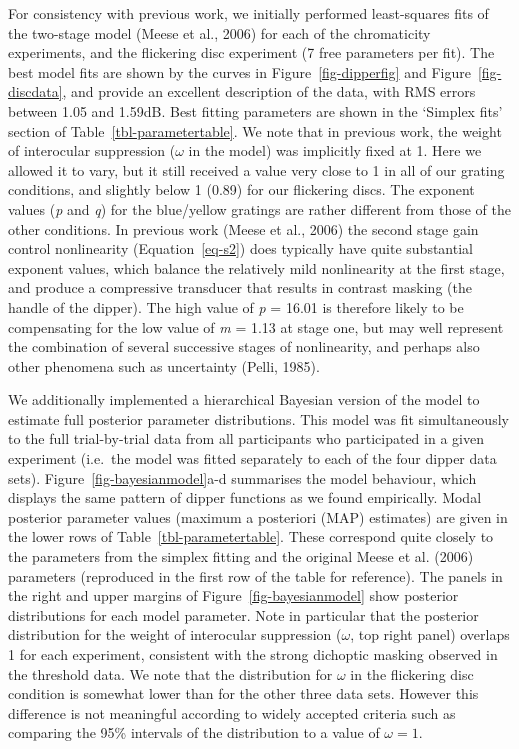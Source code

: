 \documentclass[
  letterpaper,
  DIV=11,
  numbers=noendperiod]{scrartcl}
\begin{document}
For consistency with previous work, we initially performed least-squares
fits of the two-stage model (Meese et al., 2006) for each of the
chromaticity experiments, and the flickering disc experiment (7 free
parameters per fit). The best model fits are shown by the curves in
Figure~\ref{fig-dipperfig} and Figure~\ref{fig-discdata}, and provide an
excellent description of the data, with RMS errors between 1.05 and
1.59dB. Best fitting parameters are shown in the `Simplex fits' section
of Table~\ref{tbl-parametertable}. We note that in previous work, the
weight of interocular suppression (\(\omega\) in the model) was
implicitly fixed at 1. Here we allowed it to vary, but it still received
a value very close to 1 in all of our grating conditions, and slightly
below 1 (0.89) for our flickering discs. The exponent values (\emph{p}
and \emph{q}) for the blue/yellow gratings are rather different from
those of the other conditions. In previous work (Meese et al., 2006) the
second stage gain control nonlinearity (Equation~\ref{eq-s2}) does
typically have quite substantial exponent values, which balance the
relatively mild nonlinearity at the first stage, and produce a
compressive transducer that results in contrast masking (the handle of
the dipper). The high value of \emph{p} = 16.01 is therefore likely to
be compensating for the low value of \emph{m} = 1.13 at stage one, but
may well represent the combination of several successive stages of
nonlinearity, and perhaps also other phenomena such as uncertainty
(Pelli, 1985).

We additionally implemented a hierarchical Bayesian version of the model
to estimate full posterior parameter distributions. This model was fit
simultaneously to the full trial-by-trial data from all participants who
participated in a given experiment (i.e.~the model was fitted separately
to each of the four dipper data sets). Figure~\ref{fig-bayesianmodel}a-d
summarises the model behaviour, which displays the same pattern of
dipper functions as we found empirically. Modal posterior parameter
values (maximum a posteriori (MAP) estimates) are given in the lower
rows of Table~\ref{tbl-parametertable}. These correspond quite closely
to the parameters from the simplex fitting and the original Meese et al.
(2006) parameters (reproduced in the first row of the table for
reference). The panels in the right and upper margins of
Figure~\ref{fig-bayesianmodel} show posterior distributions for each
model parameter. Note in particular that the posterior distribution for
the weight of interocular suppression (\(\omega\), top right panel)
overlaps 1 for each experiment, consistent with the strong dichoptic
masking observed in the threshold data. We note that the distribution
for \(\omega\) in the flickering disc condition is somewhat lower than
for the other three data sets. However this difference is not meaningful
according to widely accepted criteria such as comparing the 95\%
intervals of the distribution to a value of \(\omega=1\).
\end{document}
